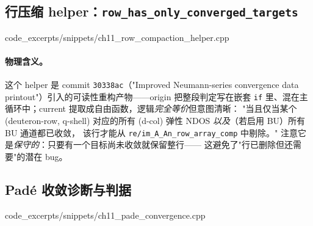 \subsection{行压缩 helper：\texttt{row\_has\_only\_converged\_targets}}
\label{subsec:ch11-row-compaction}


  {code_excerpts/snippets/ch11_row_compaction_helper.cpp}

\paragraph{物理含义。}
这个 helper 是 commit \texttt{30338ac}（"Improved Neumann-series convergence
data printout"）引入的可读性重构产物——origin 把整段判定写在嵌套 \texttt{if}
里、混在主循环中；current 提取成自由函数，逻辑\emph{完全等价}但意图清晰：
"当且仅当某个 (deuteron-row, q-shell) 对应的所有 (d-col)
弹性 NDOS \emph{以及}（若启用 BU）所有 BU 通道都已收敛，
该行才能从 \texttt{re/im\_A\_An\_row\_array\_comp} 中剔除。"
注意它是\emph{保守的}：只要有一个目标尚未收敛就保留整行——
这避免了"行已删除但还需要"的潜在 bug。

\subsection{Padé 收敛诊断与判据}
\label{subsec:ch11-pade-convergence}


  {code_excerpts/snippets/ch11_pade_convergence.cpp}

